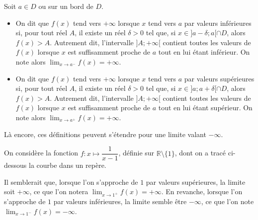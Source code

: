 \documentclass[11pt,fleqn, openany]{book} %
\begin{document}
\begin{definition}Soit $a \in D$ ou sur un bord de $D$.
\begin{itemize}
\item On dit que $f(x)$ tend vers $+\infty$ lorsque $x$ tend vers $a$ par valeurs inférieures  si, pour tout réel $A$, il existe un réel $\delta >0$ tel que, si $x\in ]a - \delta ; a[\cap D$, alors $f(x) > A$. Autrement dit, l'intervalle $]A;+\infty[$ contient toutes les valeurs de $f(x)$ lorsque $x$ est suffisamment proche de $a$ tout en lui étant inférieur. On note alors $\displaystyle \lim_{x \to a^-} f(x) =+\infty $.
\item On dit que $f(x)$ tend vers $+\infty$ lorsque $x$ tend vers $a$ par valeurs supérieures  si, pour tout réel $A$, il existe un réel $\delta >0$ tel que, si $x\in ]a ; a+\delta[\cap D$, alors $f(x) > A$. Autrement dit, l'intervalle $]A;+\infty[$ contient toutes les valeurs de $f(x)$ lorsque $x$ est suffisamment proche de $a$ tout en lui étant supérieur. On note alors $\displaystyle \lim_{x \to a^+} f(x) =+\infty $.
\end{itemize}
\end{definition}

Là encore, ces définitions peuvent s'étendre pour une limite valant $-\infty$.


\begin{example} On considère la fonction $f:x\mapsto \dfrac{1}{x-1}$, définie sur $\mathbb{R} \setminus \{1\}$, dont on a tracé ci-dessous la courbe dans un repère.

\begin{minipage}{0.3\linewidth}
\begin{center}

\end{center}
\end{minipage}\hfill\begin{minipage}{0.65\linewidth}

Il semblerait que, lorsque l'on s'approche de $1$ par valeurs supérieures, la limite soit $+\infty$, ce que l'on notera $\displaystyle \lim_{x \to 1^+} f(x) =+\infty $.
\vskip5pt
En revanche, lorsque l'on s'approche de $1$ par valeurs inférieures, la limite semble être $-\infty$, ce que l'on note $\displaystyle \lim_{x \to 1^-} f(x) =-\infty $. \end{minipage}
\end{example}
\end{document}

